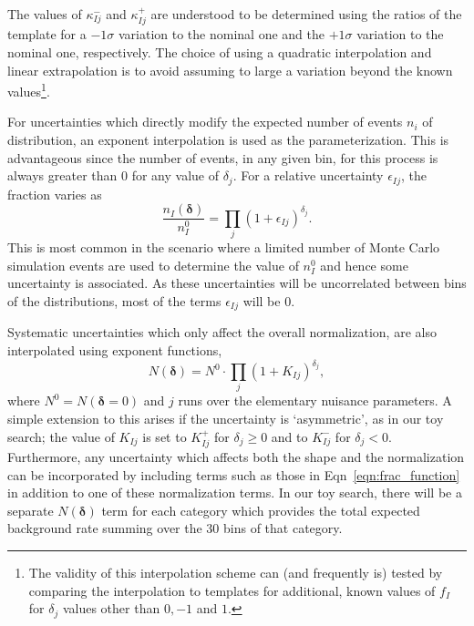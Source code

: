 \documentclass[11pt]{article}
\begin{document}
The values of $\kappa_{Ij}^{-}$ and $\kappa_{Ij}^{+}$ are understood to be determined using the ratios of the template for a $-1\sigma$ variation to the nominal one and the $+1\sigma$
variation to the nominal one, respectively. The choice of using a quadratic interpolation and linear extrapolation is to avoid assuming to large a variation beyond the known
values\footnote{The validity of this interpolation scheme can (and frequently is) tested by comparing the interpolation to templates for additional, known values of $f_{I}$ for $\delta_{j}$ values other than $0,-1$ and $1$.}.

For uncertainties which directly modify the expected number of events $n_{i}$ of distribution, an exponent interpolation is used as the parameterization.
This is advantageous since the number of events, in any given bin, for this process is always greater than 0 for any value of $\delta_{j}$. For a relative uncertainty $\epsilon_{Ij}$, the fraction varies as
%
\begin{equation}
 \frac{n_{I}(\bm{\delta})}{n_{I}^{0}}  =  \prod_{j} (1+\epsilon_{Ij})^{\delta_{j}}.
  \label{eqn:bin_function}
\end{equation}
%
This is most common in the scenario where a limited number of Monte Carlo simulation events are used to determine the value of $n_{I}^{0}$
and hence some uncertainty is associated. As these uncertainties will be uncorrelated between bins of the distributions, most of the terms $\epsilon_{Ij}$ will be 0.

Systematic uncertainties which only affect the overall normalization, are also interpolated using exponent functions,
%
\begin{equation}
 N(\bm{\delta})  =   N^{0} \cdot \prod_{j} (1+K_{Ij})^{\delta_{j}},
 \label{eqn:norm_function}
\end{equation}
%
where $N^{0} = N(\bm{\delta}=0)$ and $j$ runs over the elementary nuisance parameters.  A simple extension to this arises if the uncertainty is `asymmetric', as in our toy search;
the value of $K_{Ij}$ is set to $K^{+}_{Ij}$ for $\delta_{j}\geq0$ and to $K^{-}_{Ij}$ for $\delta_{j} < 0$. Furthermore, any uncertainty which affects both the
shape and the normalization can be incorporated by including terms such as those in Eqn~\ref{eqn:frac_function} in addition to one of these normalization terms.
In our toy search, there will be a separate $N(\bm{\delta})$ term for each category which provides the total expected background rate summing over the 30 bins of that category.
\end{document}
